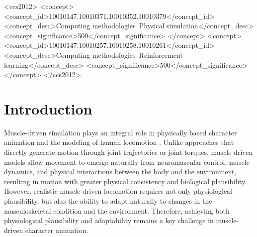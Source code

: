 \documentclass[manuscript,screen,review,anonymous]{acmart}
\begin{document}
\begin{CCSXML}
<ccs2012>
 <concept>
  <concept_id>10010147.10010371.10010352.10010379</concept_id>
  <concept_desc>Computing methodologies~Physical simulation</concept_desc>
  <concept_significance>500</concept_significance>
 </concept>
 <concept>
  <concept_id>10010147.10010257.10010258.10010261</concept_id>
  <concept_desc>Computing methodologies~Reinforcement learning</concept_desc>
  <concept_significance>500</concept_significance>
 </concept>
</ccs2012>
\end{CCSXML}


\maketitle

\section{Introduction}
\label{sec:introduction}
Muscle-driven simulation plays an integral role in physically based character animation and the modeling of human locomotion \cite{sun2024,schumacher2025}. Unlike approaches that directly generate motion through joint trajectories or joint torques, muscle-driven models allow movement to emerge naturally from neuromuscular control, muscle dynamics, and physical interactions between the body and the environment, resulting in motion with greater physical consistency and biological plausibility. However, realistic muscle-driven locomotion requires not only physiological plausibility, but also the ability to adapt naturally to changes in the musculoskeletal condition and the environment. Therefore, achieving both physiological plausibility and adaptability remains a key challenge in muscle-driven character animation.
\end{document}
